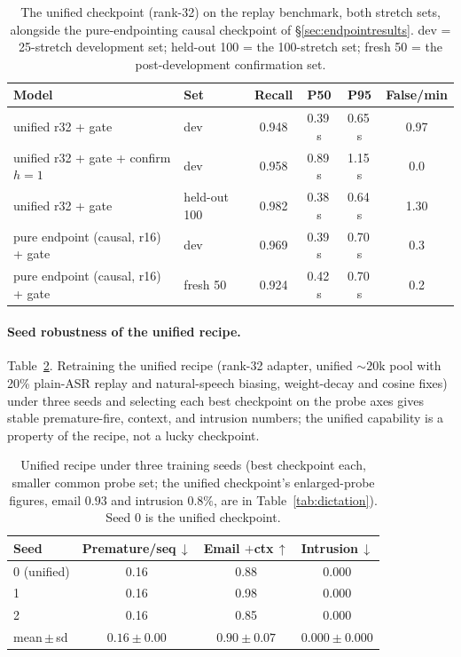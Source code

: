 \documentclass[11pt]{article}
\begin{document}
\begin{table}[h]
  \centering\small
  \caption{The unified checkpoint (rank-32) on the replay benchmark, both stretch sets, alongside the pure-endpointing causal checkpoint of \S\ref{sec:endpointresults}. dev = 25-stretch development set; held-out 100 = the 100-stretch set; fresh 50 = the post-development confirmation set.}
  \label{tab:released}
  \begin{tabular}{llcccc}
    \toprule
    Model & Set & Recall & P50 & P95 & False/min \\
    \midrule
    unified r32 + gate & dev & 0.948 & 0.39\,s & 0.65\,s & 0.97 \\
    unified r32 + gate + confirm $h{=}1$ & dev & 0.958 & 0.89\,s & 1.15\,s & 0.0 \\
    unified r32 + gate & held-out 100 & 0.982 & 0.38\,s & 0.64\,s & 1.30 \\
    \midrule
    pure endpoint (causal, r16) + gate & dev & 0.969 & 0.39\,s & 0.70\,s & 0.3 \\
    pure endpoint (causal, r16) + gate & fresh 50 & 0.924 & 0.42\,s & 0.70\,s & 0.2 \\
    \bottomrule
  \end{tabular}
\end{table}

\paragraph{Seed robustness of the unified recipe.} Table~\ref{tab:seeds}. Retraining the unified recipe (rank-32 adapter, unified ${\sim}20$k pool with 20\% plain-ASR replay and natural-speech biasing, weight-decay and cosine fixes) under three seeds and selecting each best checkpoint on the probe axes gives stable premature-fire, context, and intrusion numbers; the unified capability is a property of the recipe, not a lucky checkpoint.

\begin{table}[h]
  \centering\small
  \caption{Unified recipe under three training seeds (best checkpoint each, smaller common probe set; the unified checkpoint's enlarged-probe figures, email $0.93$ and intrusion $0.8\%$, are in Table~\ref{tab:dictation}). Seed 0 is the unified checkpoint.}
  \label{tab:seeds}
  \begin{tabular}{lccc}
    \toprule
    Seed & Premature/seq\,$\downarrow$ & Email $+$ctx\,$\uparrow$ & Intrusion\,$\downarrow$ \\
    \midrule
    0 (unified) & 0.16 & 0.88 & 0.000 \\
    1 & 0.16 & 0.98 & 0.000 \\
    2 & 0.16 & 0.85 & 0.000 \\
    \midrule
    mean\,$\pm$\,sd & $0.16\pm0.00$ & $0.90\pm0.07$ & $0.000\pm0.000$ \\
    \bottomrule
  \end{tabular}
\end{table}
\end{document}
